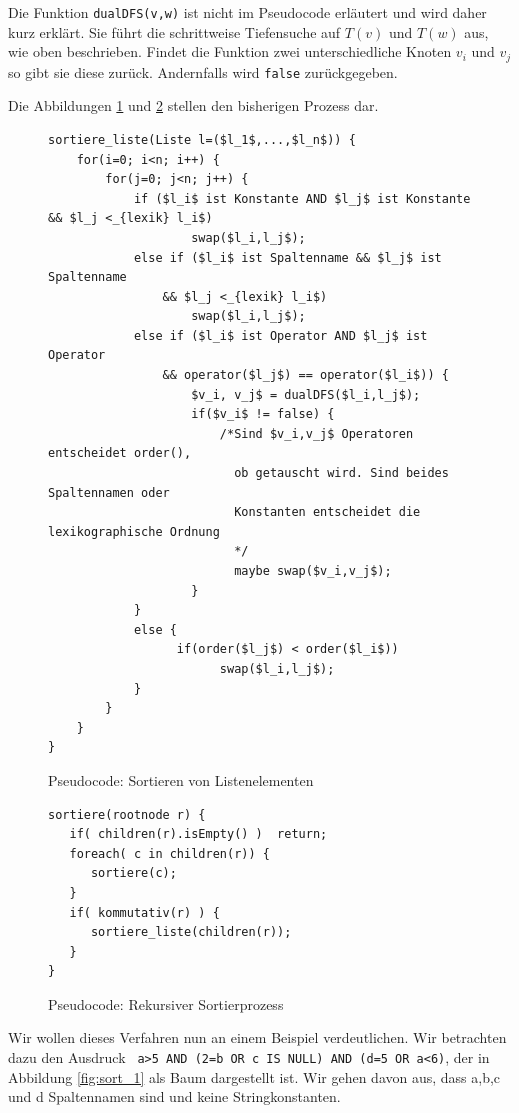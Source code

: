 Die Funktion \verb|dualDFS(v,w)| ist nicht im Pseudocode erläutert und wird daher kurz erklärt. Sie führt die schrittweise Tiefensuche auf $T(v)$ und $T(w)$ aus, wie oben beschrieben. Findet die Funktion zwei unterschiedliche Knoten $v_i$ und $v_j$ so gibt sie diese zurück. Andernfalls wird \verb|false| zurückgegeben.

Die Abbildungen \ref{fig:pesudocode1} und \ref{fig:pesudocode2} stellen den bisherigen Prozess dar.

\begin{figure}[H]

\begin{lstlisting}[mathescape]
sortiere_liste(Liste l=($l_1$,...,$l_n$)) {
	for(i=0; i<n; i++) {
		for(j=0; j<n; j++) {
			if ($l_i$ ist Konstante AND $l_j$ ist Konstante && $l_j <_{lexik} l_i$)
					swap($l_i,l_j$);
			else if ($l_i$ ist Spaltenname && $l_j$ ist Spaltenname
				&& $l_j <_{lexik} l_i$)
					swap($l_i,l_j$);
			else if ($l_i$ ist Operator AND $l_j$ ist Operator
				&& operator($l_j$) == operator($l_i$)) {
					$v_i, v_j$ = dualDFS($l_i,l_j$);
					if($v_i$ != false) {
						/*Sind $v_i,v_j$ Operatoren  entscheidet order(), 
						  ob getauscht wird. Sind beides Spaltennamen oder 
						  Konstanten entscheidet die lexikographische Ordnung 
						  */
						  maybe swap($v_i,v_j$);
					}
			} 
			else {
				  if(order($l_j$) < order($l_i$)) 
				  		swap($l_i,l_j$);
			}
		}
	}
}\end{lstlisting}			
\caption{Pseudocode: Sortieren von Listenelementen}
\label{fig:pesudocode1}
\end{figure}

\begin{figure}[H]
\begin{lstlisting}[mathescape]
sortiere(rootnode r) {
   if( children(r).isEmpty() )  return;        
   foreach( c in children(r)) {
      sortiere(c);
   }           
   if( kommutativ(r) ) {
      sortiere_liste(children(r));
   }
}
\end{lstlisting}
\caption{Pseudocode: Rekursiver Sortierprozess}
\label{fig:pesudocode2}
\end{figure}

Wir wollen dieses Verfahren nun an einem Beispiel verdeutlichen. Wir betrachten dazu den Ausdruck \verb| a>5 AND (2=b OR c IS NULL) AND (d=5 OR a<6)|, der in Abbildung \ref{fig:sort_1} als Baum dargestellt ist. Wir gehen davon aus, dass a,b,c und d Spaltennamen sind und keine Stringkonstanten.

